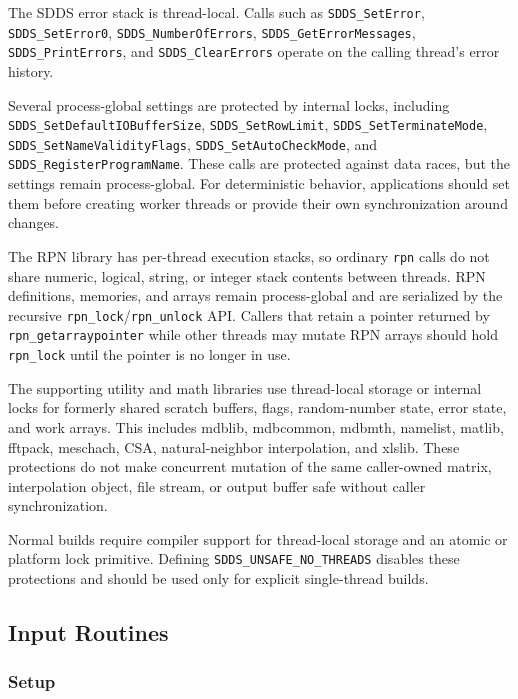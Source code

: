 \documentclass[11pt]{article}
\begin{document}
The SDDS error stack is thread-local. Calls such as {\tt SDDS\_SetError},
{\tt SDDS\_SetError0}, {\tt SDDS\_NumberOfErrors},
{\tt SDDS\_GetErrorMessages}, {\tt SDDS\_PrintErrors}, and
{\tt SDDS\_ClearErrors} operate on the calling thread's error history.

Several process-global settings are protected by internal locks, including
{\tt SDDS\_SetDefaultIOBufferSize}, {\tt SDDS\_SetRowLimit},
{\tt SDDS\_SetTerminateMode}, {\tt SDDS\_SetNameValidityFlags},
{\tt SDDS\_SetAutoCheckMode}, and {\tt SDDS\_RegisterProgramName}. These calls
are protected against data races, but the settings remain process-global. For
deterministic behavior, applications should set them before creating worker
threads or provide their own synchronization around changes.

The RPN library has per-thread execution stacks, so ordinary {\tt rpn} calls do
not share numeric, logical, string, or integer stack contents between threads.
RPN definitions, memories, and arrays remain process-global and are serialized
by the recursive {\tt rpn\_lock}/{\tt rpn\_unlock} API. Callers that retain a
pointer returned by {\tt rpn\_getarraypointer} while other threads may mutate
RPN arrays should hold {\tt rpn\_lock} until the pointer is no longer in use.

The supporting utility and math libraries use thread-local storage or internal
locks for formerly shared scratch buffers, flags, random-number state, error
state, and work arrays. This includes mdblib, mdbcommon, mdbmth, namelist,
matlib, fftpack, meschach, CSA, natural-neighbor interpolation, and xlslib.
These protections do not make concurrent mutation of the same caller-owned
matrix, interpolation object, file stream, or output buffer safe without caller
synchronization.

Normal builds require compiler support for thread-local storage and an atomic or
platform lock primitive. Defining {\tt SDDS\_UNSAFE\_NO\_THREADS} disables these
protections and should be used only for explicit single-thread builds.

\subsection{Input Routines}
\subsubsection{Setup}
\end{document}
